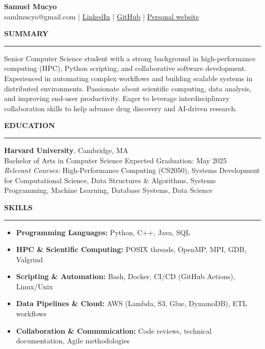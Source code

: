 \documentclass[11pt,a4paper]{article}
\newcommand{\sectionheading}[1]{\vspace{0.2cm}\textbf{\Large #1}\vspace{0.1cm}\hrule\vspace{0.3cm}}
\newcommand{\subheading}[1]{\textbf{#1}}
\newcommand{\daterange}[1]{\hfill{#1}}
\begin{document}
\begin{center}
    \textbf{\LARGE Samuel Mucyo}\\
    \vspace{0.3cm}
    samlmucyo@gmail.com \enspace | \enspace
    \href{https://www.linkedin.com/in/mucyo-samuel}{LinkedIn}
    \enspace | \enspace
    \href{https://github.com/Sam-Mucyo}{GitHub}
    \enspace | \enspace
    \href{https://sam-mucyo.github.io/}{Personal website}
\end{center}



\sectionheading{SUMMARY}
Senior Computer Science student with a strong background in high-performance computing (HPC), Python scripting, and collaborative software development. Experienced in automating complex workflows and building scalable systems in distributed environments. Passionate about scientific computing, data analysis, and improving end-user productivity. Eager to leverage interdisciplinary collaboration skills to help advance drug discovery and AI-driven research.

\sectionheading{EDUCATION}
\subheading{Harvard University}, Cambridge, MA \\
Bachelor of Arts in Computer Science \hfill \daterange{Expected Graduation: May 2025} \\
\textit{Relevant Courses:} High-Performance Computing (CS2050), Systems Development for Computational Science, Data Structures \& Algorithms, Systems Programming, Machine Learning, Database Systems, Data Science

\sectionheading{SKILLS}
\begin{itemize}[leftmargin=*,nosep]
    \item \textbf{Programming Languages:} Python, C++, Java, SQL
    \item \textbf{HPC \& Scientific Computing:} POSIX threads, OpenMP, MPI, GDB, Valgrind
    \item \textbf{Scripting \& Automation:} Bash, Docker, CI/CD (GitHub Actions), Linux/Unix
    \item \textbf{Data Pipelines \& Cloud:} AWS (Lambda, S3, Glue, DynamoDB), ETL workflows
    \item \textbf{Collaboration \& Communication:} Code reviews, technical documentation, Agile methodologies
\end{itemize}
\end{document}
